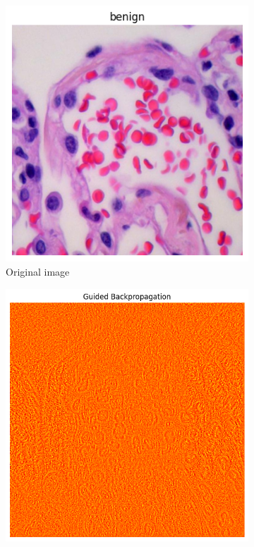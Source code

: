 \documentclass[10pt,twocolumn]{article}
\begin{document}
\begin{figure}[h]
\centering
\begin{subfigure}{0.32\columnwidth}
\includegraphics[width=\linewidth]{imgs/normal_image.png}
\caption{Original image}
\end{subfigure}
\hfill
\begin{subfigure}{0.32\columnwidth}
\includegraphics[width=\linewidth]{imgs/scatnet_gbp.png}

\end{subfigure}
\end{figure}
\end{document}
